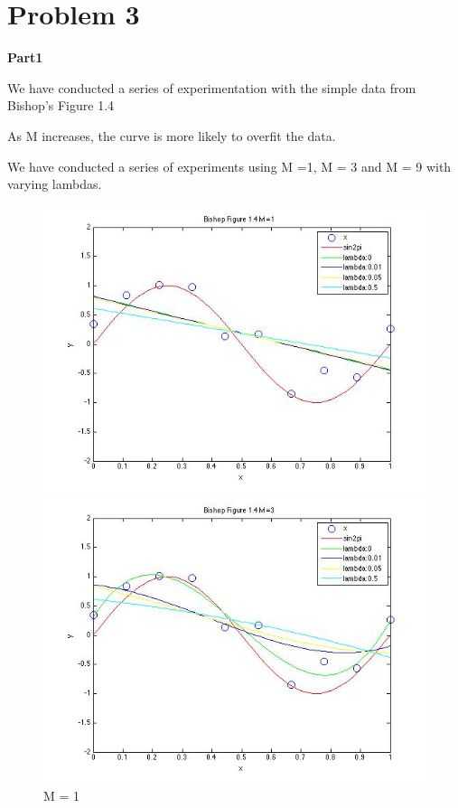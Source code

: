 \section{Problem 3}

{\bfseries Part1}

We have conducted a series of experimentation with the simple data from Bishop's Figure 1.4

As M increases, the curve is more likely to overfit the data. 

We have conducted a series of experiments using M =1, M = 3 and M = 9 with varying lambdas. 


\begin{figure}[!htb]
  \includegraphics[width=\linewidth]{figures/p3_bishop_m=1}
  \caption{M = 1}\label{fig:figures/p3_bishop_m=1}
\endminipage\hfill
{}
  \includegraphics[width=\linewidth]{figures/p3_bishop_m=3}

\end{figure}
